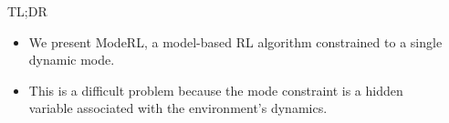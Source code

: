 \documentclass[final,11pt]{beamer}
\newlength{\sepwidth}
\newlength{\colwidth}
\newcommand{\separatorcolumn}{\begin{column}{\sepwidth}\end{column}}
\begin{document}
\begin{frame}[t]
\begin{tikzpicture}[remember picture,overlay,scale=1]
\end{tikzpicture}

\begin{columns}[t]

\separatorcolumn

\begin{column}{\colwidth}

  \begin{alertblock}{TL;DR}

   \begin{itemize}
      \item We present \alert{ModeRL}, a model-based RL algorithm constrained to a single dynamic mode.
      \item This is a difficult problem because the \alert{mode constraint} is a \alert{hidden variable} associated with the environment’s dynamics.


\end{itemize}
\end{alertblock}
\end{column}
\end{columns}
\end{frame}
\end{document}
